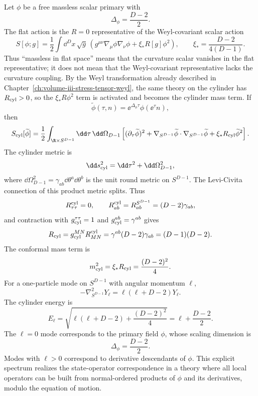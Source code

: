 Let \(\phi\) be a free massless scalar primary with
\[
  \Delta_\phi=\frac{D-2}{2}.
\]
The flat action is the \(R=0\) representative of the Weyl-covariant scalar
action
\begin{equation}
  S[\phi;g]
  =
  \frac12\int \dd^D x\,\sqrt g\,
  \left(
    g^{\mu\nu}\nabla_\mu\phi\nabla_\nu\phi
    +\xi_\ast R[g]\phi^2
  \right),
  \qquad
  \xi_\ast=\frac{D-2}{4(D-1)}.
  \label{eq:conformal-scalar-action-radial-check}
\end{equation}
Thus ``massless in flat space'' means that the curvature scalar vanishes in
the flat representative; it does not mean that the Weyl-covariant
representative lacks the curvature coupling.  By the Weyl transformation
already described in Chapter~\ref{ch:volume-iii-stress-tensor-weyl}, the same
theory on the cylinder has \(R_{\rm cyl}>0\), so the
\(\xi_\ast R\phi^2\) term is activated and becomes the cylinder mass term.  If
\[
  \widetilde\phi(\tau,n)=\ee^{\Delta_\phi\tau}\phi(\ee^\tau n),
\]
then
\begin{equation}
  S_{\rm cyl}[\widetilde\phi]
  =
  \frac12\int_{\R\times S^{D-1}}\dd\tau\,\dd\Omega_{D-1}
  \left[
    (\partial_\tau\widetilde\phi)^2
    +
    \nabla_{S^{D-1}}\widetilde\phi\cdot
    \nabla_{S^{D-1}}\widetilde\phi
    +
    \xi_\ast R_{\rm cyl}\widetilde\phi^2
  \right].
  \label{eq:free-scalar-cylinder-action}
\end{equation}
The cylinder metric is
\[
  \dd s_{\rm cyl}^2=\dd\tau^2+\dd\Omega_{D-1}^2,
\]
where \(\dd\Omega_{D-1}^2=\gamma_{ab}\dd\theta^a\dd\theta^b\) is the unit
round metric on \(S^{D-1}\).  The Levi-Civita connection of this product
metric splits.  Thus
\[
  R_{\tau\tau}^{\rm cyl}=0,
  \qquad
  R_{ab}^{\rm cyl}=R_{ab}^{S^{D-1}}=(D-2)\gamma_{ab},
\]
and contraction with \(g_{\rm cyl}^{\tau\tau}=1\) and
\(g_{\rm cyl}^{ab}=\gamma^{ab}\) gives
\[
  R_{\rm cyl}
  =
  g_{\rm cyl}^{MN}R_{MN}^{\rm cyl}
  =
  \gamma^{ab}(D-2)\gamma_{ab}
  =
  (D-1)(D-2).
\]
The conformal mass term is
\[
  m_{\mathrm{cyl}}^2=\xi_\ast R_{\rm cyl}=\frac{(D-2)^2}{4}.
\]
For a one-particle mode on \(S^{D-1}\) with angular momentum \(\ell\),
\[
  -\nabla^2_{S^{D-1}}Y_{\ell}=\ell(\ell+D-2)Y_{\ell}.
\]
The cylinder energy is
\[
  E_\ell
  =
  \sqrt{\ell(\ell+D-2)+\frac{(D-2)^2}{4}}
  =
  \ell+\frac{D-2}{2}.
\]
The \(\ell=0\) mode corresponds to the primary field \(\phi\), whose scaling
dimension is
\[
  \Delta_\phi=\frac{D-2}{2}.
\]
Modes with \(\ell>0\) correspond to derivative descendants of \(\phi\).  This
explicit spectrum realizes the state-operator correspondence in a theory where
all local operators can be built from normal-ordered products of \(\phi\) and
its derivatives, modulo the equation of motion.

